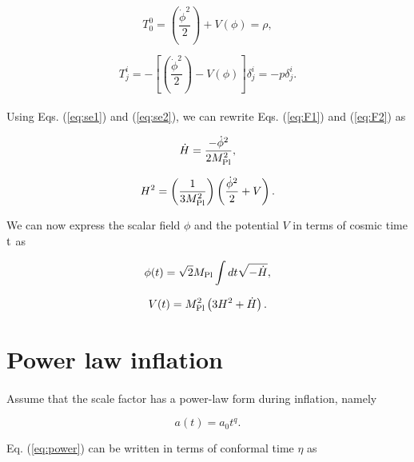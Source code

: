 \documentclass[12pt,a4paper,oneside]{book}
\begin{document}
\begin{equation}\label{eq:se1}
T^{0}_{0} = \left(\frac{\dot{\phi}^2}{2}\right) +V(\phi) = \rho,
\end{equation}

\begin{equation}\label{eq:se2}
T^{i}_{j} = -\left[\left(\frac{\dot{\phi}^2}{2}\right) - V(\phi)\right]\delta^{i}_{j} = -p\delta^i_j.
\end{equation}

\paragraph*{} Using Eqs. (\ref{eq:se1}) and (\ref{eq:se2}), we can rewrite Eqs. (\ref{eq:F1}) and (\ref{eq:F2}) as

\begin{equation}
 \dot{H} = \frac{-\dot{\phi}^2}{2M_{\rm Pl}^2},
\end{equation}

\begin{equation}\label{eq:Hparam}
H^2 = \left(\frac{1}{3M_{\rm Pl}^2}\right)\left(\frac{\dot{\phi}^2}{2} + V\right).
\end{equation}

\noindent We can now express the scalar field $\phi$ and the potential $V$ in terms of cosmic time ${\rm t}$ as

\begin{equation}
\phi(t)= \sqrt{2}M_{\rm Pl} \int dt \sqrt{-\dot{H}},
\end{equation}

\begin{equation}
V(t) = M_{\rm Pl}^2\left(3H^2 + \dot{H}\right).
\end{equation}

\section{Power law inflation}

\paragraph*{} Assume that the scale factor has a power-law form during inflation, namely

\begin{equation}\label{eq:power}
a(t) = a_0t^q.
\end{equation}

\noindent Eq. (\ref{eq:power}) can be written in terms of conformal time $\eta$ as 
\end{document}

